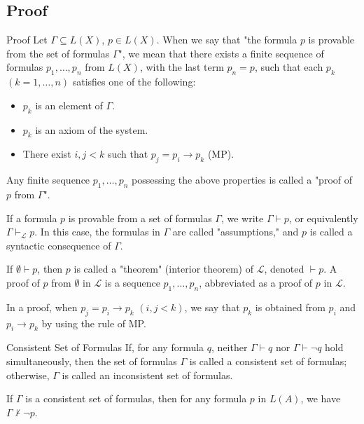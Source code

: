 \documentclass[11pt]{elegantbook}
\begin{document}
\subsection{Proof}

\begin{definition}{Proof}
    Let \(\Gamma \subseteq L(X)\), \(p \in L(X)\). 
    When we say that "the formula \(p\) is provable from the set of formulas \(\Gamma\)", 
    we mean that there exists a finite sequence of formulas \(p_1, \dots, p_n\) from \(L(X)\), 
    with the last term \(p_n = p\), such that each \(p_k\) \((k = 1, \dots, n)\) satisfies one of the following:
    \begin{itemize}
        \item \(p_k\) is an element of \(\Gamma\).
        \item \(p_k\) is an axiom of the system.
        \item There exist \(i, j < k\) such that \(p_j = p_i \to p_k\) (MP).
    \end{itemize}
    Any finite sequence \(p_1, \dots, p_n\) possessing the above properties 
    is called a "proof of \(p\) from \(\Gamma\)".
\end{definition}

If a formula \(p\) is provable from a set of formulas \(\Gamma\), 
we write \(\Gamma \vdash p\), or equivalently \(\Gamma \vdash_{\mathcal{L}} p\). 
In this case, the formulas in \(\Gamma\) are called "assumptions," 
and \(p\) is called a syntactic consequence of \(\Gamma\).

If \(\emptyset\vdash p\), then \(p\) is called a "theorem" (interior theorem) of \(\mathcal{L}\), 
denoted \(\vdash p\). 
A proof of \(p\) from \(\emptyset\) in \(\mathcal{L}\) is a sequence \(p_1, \dots, p_n\), 
abbreviated as a proof of \(p\) in \(\mathcal{L}\).

In a proof, when \(p_{j} = p_i \to p_k\) \((i, j < k)\), 
we say that \(p_k\) is obtained from \(p_i\) and \(p_i \to p_k\) 
by using the rule of MP.

\begin{definition}{Consistent Set of Formulas}
    If, for any formula \(q\), neither \(\Gamma \vdash q\) nor \(\Gamma \vdash \neg q\) hold simultaneously, 
    then the set of formulas \(\Gamma\) is called a consistent set of formulas; 
    otherwise, \(\Gamma\) is called an inconsistent set of formulas.
    
\end{definition}

\begin{proposition}
    If \(\Gamma\) is a consistent set of formulas, then for any formula \(p\) in \(L(A)\), 
    we have \(\Gamma \nvdash \neg p\).
\end{proposition}
\end{document}
